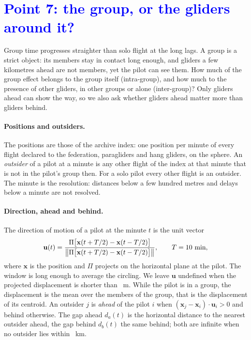 \section{\texorpdfstring{\textcolor{blue}{Point 7: the group, or the gliders around it?}}{Point 7: the group, or the gliders around it?}}\label{sec:intergroup}

Group time progresses straighter than solo flight at the long lags. A group is a strict object: its members stay in contact long enough, and gliders a few kilometres ahead are not members, yet the pilot can see them. How much of the group effect belongs to the group itself (intra-group), and how much to the presence of other gliders, in other groups or alone (inter-group)? Only gliders ahead can show the way, so we also ask whether gliders ahead matter more than gliders behind.

\paragraph{Positions and outsiders.} The positions are those of the archive index: one position per minute of every flight declared to the federation, paragliders and hang gliders, on the sphere. An \emph{outsider} of a pilot at a minute is any other flight of the index at that minute that is not in the pilot's group then. For a solo pilot every other flight is an outsider. The minute is the resolution: distances below a few hundred metres and delays below a minute are not resolved.

\paragraph{Direction, ahead and behind.} The direction of motion of a pilot at the minute $t$ is the unit vector
\[
  \mathbf{u}(t)=\frac{\Pi\bigl[\mathbf{x}(t+T/2)-\mathbf{x}(t-T/2)\bigr]}{\bigl\|\Pi\bigl[\mathbf{x}(t+T/2)-\mathbf{x}(t-T/2)\bigr]\bigr\|},\qquad T=10~\text{min},
\]
where $\mathbf{x}$ is the position and $\Pi$ projects on the horizontal plane at the pilot. The window is long enough to average the circling. We leave $\mathbf{u}$ undefined when the projected displacement is shorter than \IgMinDisp~m. While the pilot is in a group, the displacement is the mean over the members of the group, that is the displacement of its centroid.
An outsider $j$ is \emph{ahead} of the pilot $i$ when $(\mathbf{x}_j-\mathbf{x}_i)\cdot\mathbf{u}_i>0$ and behind otherwise. The gap ahead $d_a(t)$ is the horizontal distance to the nearest outsider ahead, the gap behind $d_b(t)$ the same behind; both are infinite when no outsider lies within \IgRMax~km.


